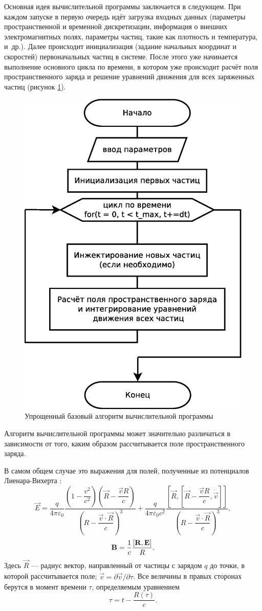 Основная идея вычислительной программы заключается в следующем. При каждом запуске в первую очередь идёт загрузка входных данных (параметры пространственной и временной дискретизации, информация о внешних электромагнитных полях, параметры частиц, такие как плотность и температура, и~др.). Далее происходит инициализация (задание начальных координат и скоростей) первоначальных частиц в системе. После этого уже начинается выполнение основного цикла по времени, в котором уже происходит расчёт поля пространственного заряда и решение уравнений движения для всех заряженных частиц (рисунок \ref{fig:Diagram1}). 

\begin{figure}[h!]
\centering
\includegraphics[width=0.5\linewidth]{./fig/ch3/Diagram1}
\caption{Упрощенный базовый алгоритм вычислительной программы}
\label{fig:Diagram1}
\end{figure}

Алгоритм вычислительной программы может значительно различаться в зависимости от того, каким образом рассчитывается поле пространственного заряда. 

В самом общем случае это выражения для полей, полученные из потенциалов Лиенара-Вихерта \cite{Landau2}:
\begin{equation}
	\vec{E} = \dfrac{q}{4 \pi \varepsilon_0} \dfrac{\left( 1 - \dfrac{v^2}{c^2} \right) \left( \vec{R} - \dfrac{\vec{v} R}{c}  \right) }{\left( R - \dfrac{\vec{v} \cdot \vec{ R}}{c} \right)^3} + \dfrac{q}{4 \pi \varepsilon_0 c^2} \dfrac{\left[ \vec{R} , \left[ \vec{R} - \dfrac{\vec{v}R}{c} , \dot{\vec{v}}  \right]  \right]}{\left( R - \dfrac{\vec{v} \cdot \vec{ R}}{c} \right)^3},
	\label{eq:opt_LV_E_early}
\end{equation}
\begin{equation}
	\mathbf{B} = \frac{1}{c} \frac{\left[ \mathbf{{R}},\mathbf{{E}} \right]}{R}.
	\label{eq:opt_LV_B_early}
\end{equation}
Здесь $\vec{R}$ --- радиус вектор, направленный от частицы с зарядом $q$ до точки, в которой рассчитывается поле;  $\dot{\vec{v}} = \partial \vec{v} / \partial \tau$. Все величины в правых сторонах берутся в момент времени $\tau$, определяемым уравнением 
\begin{equation}
	\tau = t - \frac{R(\tau)}{c}.
	\label{eq:wait_for_me}
\end{equation}


